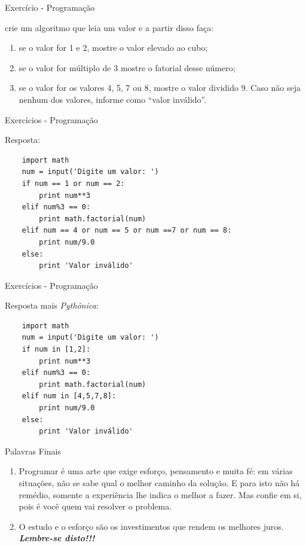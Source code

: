 \documentclass{beamer}
\begin{document}
\begin{frame}{Exercício - Programação}
\label{exercicio_10}

crie um algoritmo que leia um valor e a partir disso faça: 
\begin{enumerate}
	\item se o valor for 1 e 2, mostre o valor elevado ao cubo;
	\item se o valor for múltiplo de 3 mostre o fatorial desse número;
	\item se o valor for os valores 4, 5, 7 ou 8, mostre o valor dividido 9. Caso não seja nenhum dos valores, informe como “valor inválido”.
\end{enumerate}

\end{frame}

\begin{frame}[fragile]{Exercícios - Programação}
	\label{exercicio_10_resposta}
	
	Resposta:
	
	\begin{verbatim}
	import math
	num = input('Digite um valor: ')
	if num == 1 or num == 2:
		print num**3
	elif num%3 == 0:
		print math.factorial(num)
	elif num == 4 or num == 5 or num ==7 or num == 8:
		print num/9.0
	else:
		print 'Valor inválido'
	\end{verbatim}
	
\end{frame}

\begin{frame}[fragile]{Exercícios - Programação}
	\label{exercicio_10_resposta_pytonica}
	
	Resposta mais \textit{Pythônica}:
	
\begin{verbatim}
	import math
	num = input('Digite um valor: ')
	if num in [1,2]:
		print num**3
	elif num%3 == 0:
		print math.factorial(num)
	elif num in [4,5,7,8]:
		print num/9.0
	else:
		print 'Valor inválido'
\end{verbatim}
	
\end{frame}

\begin{frame}{Palavras Finais}
	\label{palavras_finais}
	
	\begin{enumerate}
		\item Programar é uma arte que exige esforço, pensamento e muita fé: em várias situações, não se sabe qual o melhor caminho da solução. E para isto não há remédio, somente a experiência lhe indica o melhor a fazer. Mas confie em si, pois é você quem vai resolver o problema.
		\item O estudo e o esforço são os investimentos que rendem os melhores juros. \alert{\textbf{\textit{Lembre-se disto!!!}}}
	\end{enumerate}
	
\end{frame}
\end{document}
